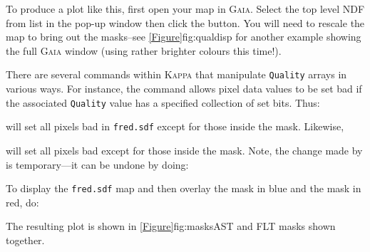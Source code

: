To produce a plot like this, first open your map in \textsc{Gaia}. Select
the top level NDF from list in the pop-up window then click the
 button. You will need to rescale the map to bring
out the masks--see \cref{Figure}{fig:qualdisp}{} for another example
showing the full \textsc{Gaia} window (using rather brighter colours this
time!).


There are several commands within \textsc{Kappa} that manipulate
\texttt{Quality} arrays in various ways. For instance, the
 command allows pixel data values to
be set bad if the associated \texttt{Quality} value has a specified
collection of set bits. Thus:

\begin{terminalv}
\end{terminalv}

will set all pixels bad in \texttt{fred.sdf} except for those inside the
 mask. Likewise,

\begin{terminalv}
\end{terminalv}

will set all pixels bad except for those inside the  mask.  Note, the
change made by  is temporary---it can be undone by doing:

\begin{terminalv}
\end{terminalv}

To display the \texttt{fred.sdf} map and then overlay the  mask in blue
and the  mask in red, do:

\begin{terminalv}
\end{terminalv}

The resulting plot is shown in \cref{Figure}{fig:masks}{AST and FLT masks
shown together}.

